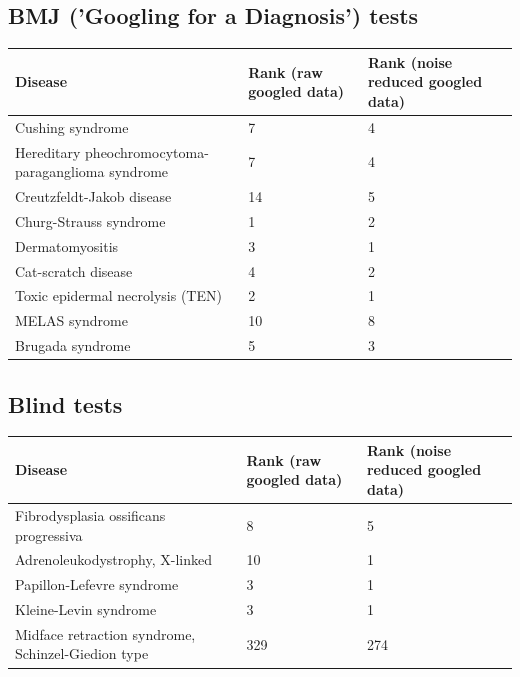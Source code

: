 \documentclass[10pt,letterpaper,final]{article}
\begin{document}
\subsection{BMJ ('Googling for a Diagnosis') tests }

\begin{center}
\begin{small}
	\begin{tabular}{|p{3.5cm}|p{1.8cm}|p{1.8cm}|}
	\hline
	\textbf{Disease}  & \textbf{Rank (raw googled data)} & \textbf{Rank (noise reduced googled data)} \\    \hline\hline
    Cushing syndrome  & 7 &  4\\    \hline
    Hereditary pheochromocytoma-paraganglioma syndrome  & 7 & 4\\    \hline
    Creutzfeldt-Jakob disease  & 14 & 5\\    \hline
    Churg-Strauss syndrome  & 1 & 2\\    \hline
    Dermatomyositis  & 3 & 1\\    \hline
    Cat-scratch disease  & 4 & 2\\    \hline
    Toxic epidermal necrolysis (TEN)  & 2 & 1\\    \hline
    MELAS syndrome  & 10 & 8\\    \hline
    Brugada syndrome  & 5 & 3\\    \hline
	\end{tabular}
\label{tab:results_bmj}
\end{small}
\end{center}

\subsection{Blind tests}

\begin{center}
\begin{small}
	\begin{tabular}{|p{3.5cm}|p{1.8cm}|p{1.8cm}|}
	\hline
	\textbf{Disease}  & \textbf{Rank (raw googled data)} & \textbf{Rank (noise reduced googled data)} \\
	\hline\hline
    Fibrodysplasia ossificans progressiva & 8 & 5\\    \hline
    Adrenoleukodystrophy, X-linked & 10 & 1 \\    \hline
    Papillon-Lefevre syndrome & 3 & 1\\    \hline
    Kleine-Levin syndrome  & 3 & 1\\    \hline
    Midface retraction syndrome, Schinzel-Giedion type  & 329 & 274\\    \hline
	\end{tabular}
\label{tab:results_blindtest}
\end{small}
\end{center}
\end{document}
